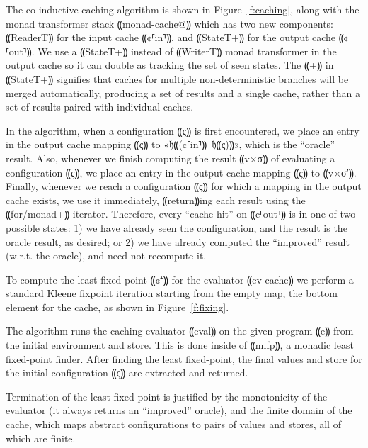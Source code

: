 The co-inductive caching algorithm is shown in Figure~\ref{f:caching}, along
with the monad transformer stack ⸨monad-cache@⸩ which has two new components:
⸨ReaderT⸩ for the input cache ⸨¢⸢in⸣⸩, and ⸨StateT+⸩ for the output cache
⸨¢⸢out⸣⸩. We use a ⸨StateT+⸩ instead of ⸨WriterT⸩ monad transformer in the
output cache so it can double as tracking the set of seen states. The ⸨+⸩ in
⸨StateT+⸩ signifies that caches for multiple non-deterministic branches will be
merged automatically, producing a set of results and a single cache, rather
than a set of results paired with individual caches.

In the algorithm, when a configuration ⸨ς⸩ is first encountered, we place an
entry in the output cache mapping ⸨ς⸩ to «𝔥⸨(¢⸢in⸣⸩\ 𝔥⸨ς)⸩», which is the
“oracle” result. Also, whenever we finish computing the result ⸨v×σ⸩ of
evaluating a configuration ⸨ς⸩, we place an entry in the output cache mapping
⸨ς⸩ to ⸨v×σ′⸩. Finally, whenever we reach a configuration ⸨ς⸩ for which a
mapping in the output cache exists, we use it immediately, ⸨return⸩ing each
result using the ⸨for/monad+⸩ iterator. Therefore, every “cache hit” on
⸨¢⸢out⸣⸩ is in one of two possible states: 1) we have already seen the
configuration, and the result is the oracle result, as desired; or 2) we have
already computed the “improved” result (w.r.t. the oracle), and need not
recompute it.

To compute the least fixed-point ⸨¢⁺⸩ for the evaluator ⸨ev-cache⸩ we perform a
standard Kleene fixpoint iteration starting from the empty map, the bottom
element for the cache, as shown in Figure~\ref{f:fixing}.

The algorithm runs the caching evaluator ⸨eval⸩ on the given program ⸨e⸩ from
the initial environment and store. This is done inside of ⸨mlfp⸩, a monadic
least fixed-point finder. After finding the least fixed-point, the final values
and store for the initial configuration ⸨ς⸩ are extracted and returned.

Termination of the least fixed-point is justified by the monotonicity of the
evaluator (it always returns an “improved” oracle), and the finite domain of
the cache, which maps abstract configurations to pairs of values and stores,
all of which are finite.

